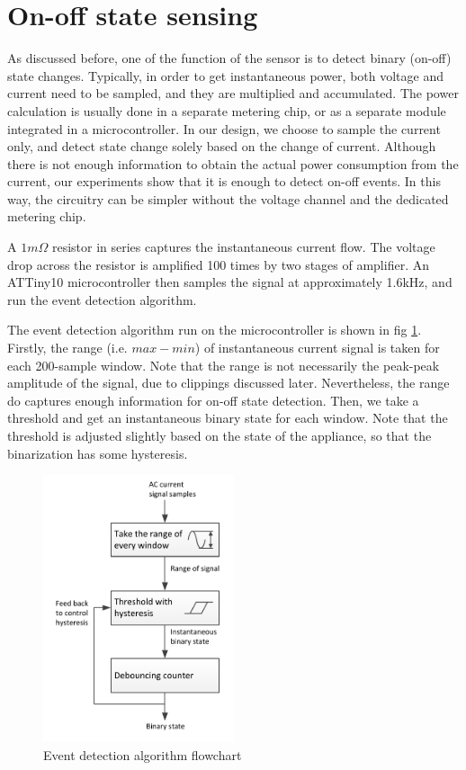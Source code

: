 \section{On-off state sensing}

As discussed before, one of the function of the sensor is to detect binary (on-off) state changes. Typically, in order to get instantaneous power, both voltage and current need to be sampled, and they are multiplied and accumulated. The power calculation is usually done in a separate metering chip, or as a separate module integrated in a microcontroller. In our design, we choose to sample the current only, and detect state change solely based on the change of current. Although there is not enough information to obtain the actual power consumption from the current, our experiments show that it is enough to detect on-off events. In this way, the circuitry can be simpler without the voltage channel and the dedicated metering chip. 

A $1m\Omega$ resistor in series captures the instantaneous current flow. The voltage drop across the resistor is amplified 100 times by two stages of amplifier. An ATTiny10 microcontroller then samples the signal at approximately 1.6kHz, and run the event detection algorithm. 

The event detection algorithm run on the microcontroller is shown in fig \ref{fig:eventdetect}. Firstly, the range (i.e. $max - min$) of instantaneous current signal is taken for each 200-sample window. Note that the range is not necessarily the peak-peak amplitude of the signal, due to clippings discussed later. Nevertheless, the range do captures enough information for on-off state detection. Then, we take a threshold and get an instantaneous binary state for each window. Note that the threshold is adjusted slightly based on the state of the appliance, so that the binarization has some hysteresis. 

\begin{figure}[htb]
  \centering
  \includegraphics[width=0.5\textwidth]{figures/eventdetect}
  \caption{Event detection algorithm flowchart}
  \label{fig:eventdetect}
\end{figure}

